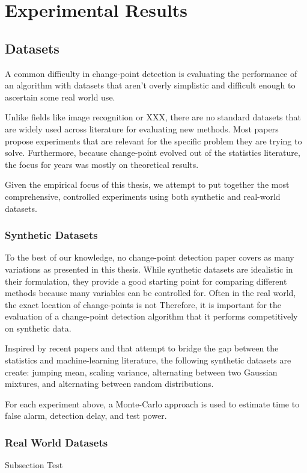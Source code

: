 \chapter{Experimental Results}
\section{Datasets}
A common difficulty in change-point detection is evaluating the performance of an algorithm with datasets that aren't overly simplistic and difficult enough to ascertain some real world use.

Unlike fields like image recognition or XXX, there are no standard datasets that are widely used across literature for evaluating new methods. Most papers propose experiments that are relevant for the specific problem they are trying to solve.  Furthermore, because change-point evolved out of the statistics literature, the focus for years was mostly on theoretical results.

Given the empirical focus of this thesis, we attempt to put together the most comprehensive, controlled experiments using both synthetic and real-world datasets.
\subsection{Synthetic Datasets}
To the best of our knowledge, no change-point detection paper covers as many variations as presented in this thesis. While synthetic datasets are idealistic in their formulation, they provide a good starting point for comparing different methods because many variables can be controlled for. Often in the real world, the exact location of change-points is not Therefore, it is important for the evaluation of a change-point detection algorithm that it performs competitively on synthetic data.

Inspired by recent papers \cite{chang2019kernel} and \cite{flynn2019change} that attempt to bridge the gap between the statistics and machine-learning literature, the following synthetic datasets are create: jumping mean, scaling variance, alternating between two Gaussian mixtures, and alternating between random distributions.

For each experiment above, a Monte-Carlo approach is used to estimate time to false alarm, detection delay, and test power. 

\subsection{Real World Datasets}
Subsection Test
